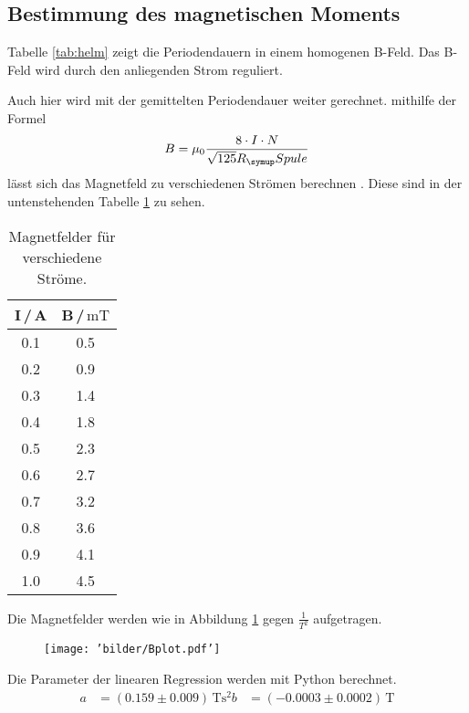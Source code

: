 \subsection{Bestimmung des magnetischen Moments}
Tabelle \ref{tab:helm} zeigt die Periodendauern in einem homogenen B-Feld. Das
B-Feld wird durch den anliegenden Strom reguliert.

Auch hier wird mit der gemittelten Periodendauer weiter gerechnet.
mithilfe der Formel
\begin{equation*}
  B=\mu_0\frac{8\cdot I\cdot N}{\sqrt{125}R_\su{Spule}}
\end{equation*}
lässt sich das Magnetfeld zu verschiedenen Strömen berechnen \cite{bfeld}.
Diese sind in der untenstehenden Tabelle \ref{tab:bfeld} zu sehen.
\begin{table}
  \centering
  \begin{tabular}{c c}
    \toprule
    I\,/\,A & B\,/\,$\si{\milli\tesla}$\\
    \midrule
    0.1 &  0.5 \\
    0.2 &  0.9 \\
    0.3 &  1.4 \\
    0.4 &  1.8 \\
    0.5 &  2.3 \\
    0.6 &  2.7 \\
    0.7 &  3.2 \\
    0.8 &  3.6 \\
    0.9 &  4.1 \\
    1.0 &  4.5 \\
    \bottomrule
  \end{tabular}
  \caption{Magnetfelder für verschiedene Ströme.}
  \label{tab:bfeld}
\end{table}
Die Magnetfelder werden wie in Abbildung \ref{fig:Bplot} gegen $\frac{1}{T^2}$
aufgetragen.
\begin{figure}
  \texttt{[image: 'bilder/Bplot.pdf']}
  \caption{}
  \label{fig:Bplot}
\end{figure}
Die Parameter der linearen Regression werden mit Python berechnet.
\begin{align*}
  a &= (0.159   \pm 0.009 )\,\si{\tesla\square\second}
  b &= (-0.0003 \pm 0.0002)\,\si{\tesla}
\end{align*}
